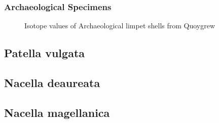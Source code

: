 \documentclass[
  authoryear,
  preprint,
  3p]{elsarticle}
\begin{document}
\subsubsection{Archaeological
Specimens}\label{archaeological-specimens-1}

\begin{figure}


\caption{\label{fig-Arch_iso}Isotope values of Archaeological limpet
shells from Quoygrew}

\end{figure}%

\subsection{Patella vulgata}\label{patella-vulgata}

\subsection{Nacella deaureata}\label{nacella-deaureata}

\subsection{Nacella magellanica}\label{nacella-magellanica}
\end{document}
